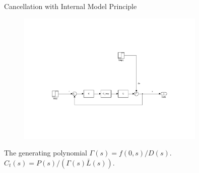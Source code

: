 \documentclass[10pt]{beamer}
\begin{document}
\begin{frame}{Cancellation with Internal Model Principle}
  \begin{figure}[h!]
    \centering %
    \includegraphics[width=0.8\textwidth, trim=6.5cm 5.5cm 5.97cm 11cm, clip=true]{../fig/matlab/imp}
  \end{figure}

  The generating polynomial $\Gamma(s) = f(0,s)/D(s)$.
  $C_{t}(s) = P(s)/(\Gamma(s)\bar{L}(s))$.
\end{frame}
\end{document}
